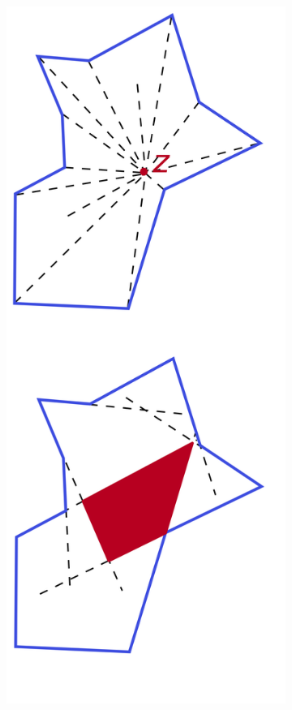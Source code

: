 \documentclass[10pt, unicode]{beamer}
\begin{document}
\begin{frame}
\begin{figure}[H]
\begin{subfigure}[l]{0.49\linewidth}
                \includegraphics[scale=0.225]{StarShapedPolygon.png}
            \end{subfigure}
        \end{figure}
    \end{frame}
\end{document}
